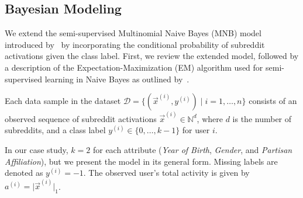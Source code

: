 \subsection{Bayesian Modeling}
\label{sec:app_bayes}
We extend the semi-supervised Multinomial Naive Bayes (MNB) model introduced by~\citet{nigam2000text} by incorporating the conditional probability of subreddit activations given the class label.
First, we review the extended model, followed by a description of the Expectation-Maximization (EM) algorithm used for semi-supervised learning in Naive Bayes as outlined by~\citet{nigam2000text}.

\vspace{2mm}

Each data sample in the dataset $\mathcal{D}=\{(\vec{x}^{(i)}, y^{(i)}) \mid i=1,\ldots,n\}$ consists of an observed sequence of subreddit activations  $\Vec{x}^{(i)} \in \mathbb{N}^d$, where $d$ is the number of subreddits, and a class label $y^{(i)}\in \{0, \ldots,  k-1\}$ for user $i$.

In our case study, $k = 2$ for each attribute (\textit{Year of Birth}, \textit{Gender}, and \textit{Partisan Affiliation}), but we present the model in its general form.
Missing labels are denoted as $y^{(i)}=-1$.
The observed user’s total activity is given by $a^{(i)}=\lvert\vec{x}^{(i)}\rvert_1$.

\vspace{2mm}

